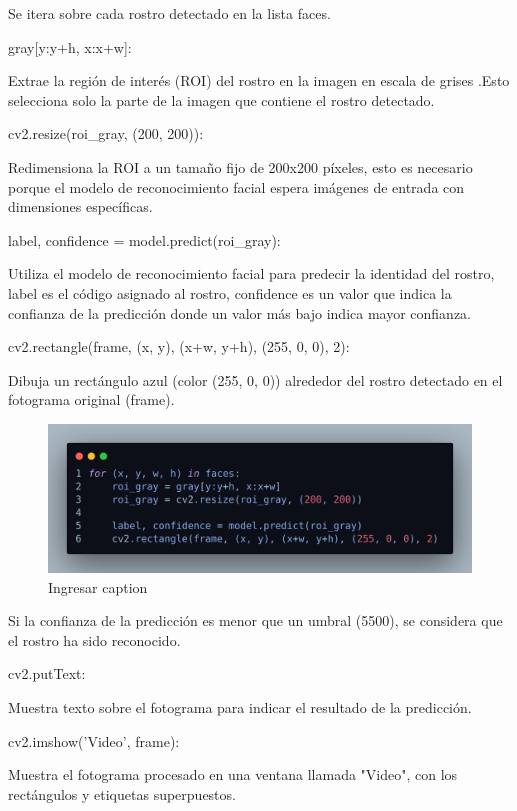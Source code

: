 \documentclass[12pt]{article}
\begin{document}
{Se itera sobre cada rostro detectado en la lista faces.

\begin{itemize}
    {\bfseries\item gray[y:y+h, x:x+w]:} Extrae la región de interés (ROI) del rostro en la imagen en escala de grises .Esto selecciona solo la parte de la imagen que contiene el rostro detectado.
    {\bfseries\item cv2.resize(roi\_gray, (200, 200)):} Redimensiona la ROI a un tamaño fijo de 200x200 píxeles, esto es necesario porque el modelo de reconocimiento facial espera imágenes de entrada con dimensiones específicas.
    {\bfseries\item label, confidence = model.predict(roi\_gray):} Utiliza el modelo de reconocimiento facial para predecir la identidad del rostro, label es el código asignado al rostro, confidence es un valor que indica la confianza de la predicción donde un valor más bajo indica mayor confianza.
    {\bfseries\item cv2.rectangle(frame, (x, y), (x+w, y+h), (255, 0, 0), 2):} Dibuja un rectángulo azul (color (255, 0, 0)) alrededor del rostro detectado en el fotograma original (frame).
\end{itemize}

\begin{figure}[h]
    \centering
    \includegraphics[width=0.9\linewidth]{imagenes/des25.png}
    \caption{Ingresar caption}
    \label{fig:enter-label}
\end{figure}

Si la confianza de la predicción es menor que un umbral (5500), se considera que el rostro ha sido reconocido.

\begin{itemize}
    {\bfseries\item cv2.putText:} Muestra texto sobre el fotograma para indicar el resultado de la predicción.
    {\bfseries\item cv2.imshow('Video', frame):} Muestra el fotograma procesado en una ventana llamada "Video", con los rectángulos y etiquetas superpuestos.
\end{itemize}

}
\end{document}
